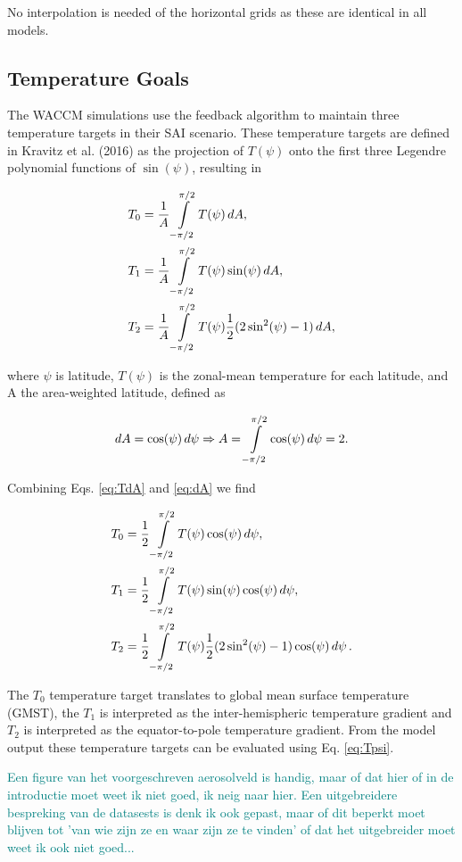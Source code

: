 No interpolation is needed of the horizontal grids as these are identical in all models. 

\subsection{Temperature Goals}
The WACCM simulations use the feedback algorithm to maintain three temperature targets in their SAI scenario. These temperature targets are defined in Kravitz et al. (2016) as the projection of $T(\psi)$ onto the first three Legendre polynomial functions of $\sin(\psi)$, resulting in

\begin{equation}\label{eq:TdA}
    \begin{split}
        T_0 &= \frac{1}{A} \int\displaylimits_{-\pi/2}^{\pi/2} T(\psi) \mathop{dA},\\
        T_1 &= \frac{1}{A} \int\displaylimits_{-\pi/2}^{\pi/2} T(\psi) \sin(\psi) \mathop{dA,}\\
        T_2 &= \frac{1}{A} \int\displaylimits_{-\pi/2}^{\pi/2} T(\psi) \frac{1}{2}(2\sin^2(\psi) -1) \mathop{dA},
    \end{split}
\end{equation}

\noindent where $\psi$ is latitude, $T(\psi)$ is the zonal-mean temperature for each latitude, and A the area-weighted latitude, defined as

\begin{equation}\label{eq:dA}
    \mathop{dA} = \cos(\psi) \mathop{d\psi} \Rightarrow A = \int\displaylimits_{-\pi/2}^{\pi/2} \cos(\psi) \mathop{d \psi} = 2.
\end{equation}

\noindent Combining Eqs. \ref{eq:TdA} and \ref{eq:dA} we find 

\begin{equation}\label{eq:Tpsi}
    \begin{split}
        T_0 &= \frac{1}{2} \int\displaylimits_{-\pi/2}^{\pi/2} T(\psi) \cos(\psi) \mathop{d\psi},\\
        T_1 &= \frac{1}{2} \int\displaylimits_{-\pi/2}^{\pi/2} T(\psi) \sin(\psi) \cos(\psi) \mathop{d\psi},\\
        T_2 &= \frac{1}{2} \int\displaylimits_{-\pi/2}^{\pi/2} T(\psi) \frac{1}{2}(2\sin^2(\psi) -1) \cos(\psi) \mathop{d\psi}.
    \end{split}
\end{equation}

The $T_0$ temperature target translates to global mean surface temperature (GMST), the $T_1$ is interpreted as the inter-hemispheric temperature gradient and $T_2$ is interpreted as the equator-to-pole temperature gradient. From the model output these temperature targets can be evaluated using Eq. \ref{eq:Tpsi}. 


\textcolor{teal}{Een figure van het voorgeschreven aerosolveld is handig, maar of dat hier of in de introductie moet weet ik niet goed, ik neig naar hier. Een uitgebreidere bespreking van de datasests is denk ik ook gepast, maar of dit beperkt moet blijven tot 'van wie zijn ze en waar zijn ze te vinden' of dat het uitgebreider moet weet ik ook niet goed...}